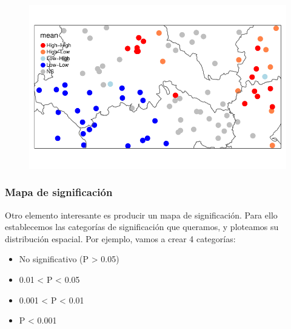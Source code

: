 \documentclass[
  letterpaper,
  DIV=11,
  numbers=noendperiod]{scrreprt}
\newenvironment{Shaded}{\begin{snugshade}}{\end{snugshade}}
\newcommand{\FloatTok}[1]{\textcolor[rgb]{0.68,0.00,0.00}{#1}}
\newcommand{\FunctionTok}[1]{\textcolor[rgb]{0.28,0.35,0.67}{#1}}
\newcommand{\NormalTok}[1]{\textcolor[rgb]{0.00,0.23,0.31}{#1}}
\newcommand{\OtherTok}[1]{\textcolor[rgb]{0.00,0.23,0.31}{#1}}
\newcommand{\SpecialCharTok}[1]{\textcolor[rgb]{0.37,0.37,0.37}{#1}}
\newcommand{\StringTok}[1]{\textcolor[rgb]{0.13,0.47,0.30}{#1}}
\begin{document}
\begin{figure}[H]

{\centering \includegraphics{04_AutocorrelacionEspacial_files/figure-pdf/unnamed-chunk-19-1.pdf}

}

\end{figure}

\hypertarget{mapa-de-significaciuxf3n}{%
\subsubsection{Mapa de significación}\label{mapa-de-significaciuxf3n}}

Otro elemento interesante es producir un mapa de significación. Para
ello establecemos las categorías de significación que queramos, y
ploteamos su distribución espacial. Por ejemplo, vamos a crear 4
categorías:

\begin{itemize}
\item
  No significativo (P \textgreater{} 0.05)
\item
  0.01 \textless{} P \textless{} 0.05
\item
  0.001 \textless{} P \textless{} 0.01
\item
  P \textless{} 0.001
\end{itemize}

\begin{Shaded}
\end{Shaded}
\end{document}
